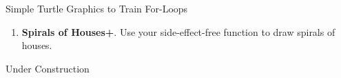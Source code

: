 \begin{task}{Simple Turtle Graphics to Train For-Loops}{}{}
\begin{enumerate}
      \item{\textbf{Spirals of Houses\up+}. Use your side-effect-free function to draw spirals of houses. }

  \end{enumerate}

  \begin{solution}
    Under Construction
    \end{solution}

  
  
\end{task}

%
%  
%
%
%
%
%
%
